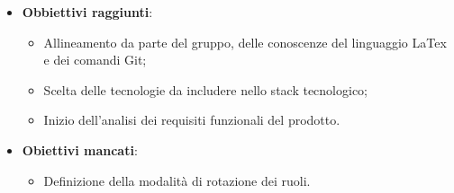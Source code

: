\begin{itemize}
\item \textbf{Obbiettivi raggiunti}:
\begin{itemize}
\item Allineamento da parte del gruppo, delle conoscenze del linguaggio LaTex e dei comandi Git;
\item Scelta delle tecnologie da includere nello stack tecnologico;
\item Inizio dell'analisi dei requisiti funzionali del prodotto.
\end{itemize}\pagebreak
\item \textbf{Obiettivi mancati}:
\begin{itemize}
\item Definizione della modalità di rotazione dei ruoli.
\end{itemize}
\end{itemize}
